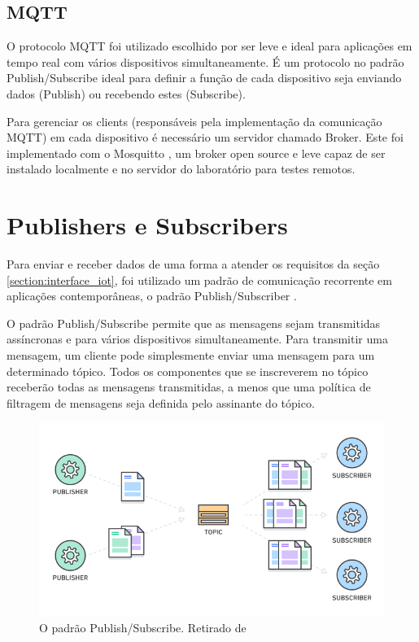 \subsection{MQTT}
\label{subsection:mqtt}

O protocolo MQTT foi utilizado escolhido por ser leve e ideal para aplicações em tempo real com vários dispositivos simultaneamente. É um protocolo no padrão Publish/Subscribe  ideal para definir a função de cada dispositivo seja enviando dados (Publish) ou recebendo estes (Subscribe).

Para gerenciar os clients (responsáveis pela implementação da comunicação MQTT) em cada dispositivo é necessário um servidor chamado Broker. Este foi implementado com o Mosquitto \cite{mosquitto}, um broker open source e leve capaz de ser instalado localmente e no servidor do laboratório para testes remotos.

\section{Publishers e Subscribers}
\label{section:publishers_subscribers}

Para enviar e receber dados de uma forma a atender os requisitos da seção \ref{section:interface_iot}, foi utilizado um padrão de comunicação recorrente em aplicações contemporâneas, o padrão Publish/Subscriber \cite{amazon:pub-sub}.

O padrão Publish/Subscribe permite que as mensagens sejam transmitidas assíncronas e para vários dispositivos simultaneamente. Para transmitir uma mensagem, um cliente pode simplesmente enviar uma mensagem para um determinado tópico. Todos os componentes que se inscreverem no tópico receberão todas as mensagens transmitidas, a menos que uma política de filtragem de mensagens seja definida pelo assinante do tópico.

\begin{figure}[h!]
\centering
\includegraphics[width=12cm]{./02_Capitulos/02_Cap3/figures/aws_pub_sub}
\caption{O padrão Publish/Subscribe. Retirado de \cite{amazon:pub-sub}}
\label{fig:3.2.0/aws_pub_sub}
\end{figure}

